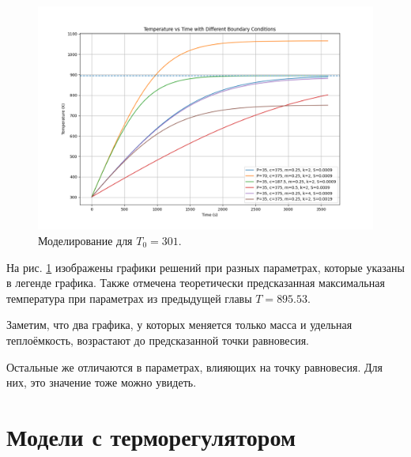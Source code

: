 \begin{figure}[h]  %
	\centering
	\includegraphics[width=1\textwidth]{imgs/heater_w.o_controll.png}  %
	\caption{Моделирование для $T_0 = 301$.}  %
	\label{fig:heater_without_controll}  %
\end{figure}

На рис. \ref{fig:heater_without_controll} изображены графики решений при разных параметрах, которые указаны в легенде графика. Также отмечена теоретически предсказанная максимальная температура при параметрах из предыдущей главы $T = 895.53$.

Заметим, что два графика, у которых меняется только масса и удельная теплоёмкость, возрастают до предсказанной точки равновесия.

Остальные же отличаются в параметрах, влияющих на точку равновесия. Для них, это значение тоже можно увидеть.
\pagebreak
\section{Модели с терморегулятором}

